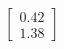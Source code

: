 \documentclass[preview]{standalone}
\begin{document}
\begin{align*}
\begin{bmatrix} 0.42 \\ 1.38 \end{bmatrix}
\end{align*}
\end{document}
